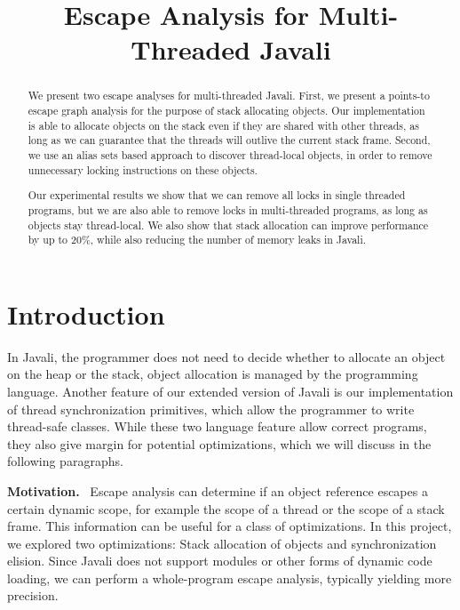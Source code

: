 \documentclass[letterpaper]{article}
\title{Escape Analysis for Multi-Threaded Javali}
\newcommand{\mypar}[1]{{\bf #1.}}
\begin{document}
%
\maketitle
%

\begin{abstract}

We present two escape analyses for multi-threaded Javali. First, we present
a points-to escape graph analysis for the purpose of stack allocating objects.
Our implementation is able to allocate objects on the stack even if they are
shared with other threads, as long as we can guarantee that the threads will
outlive the current stack frame.  Second, we use an alias sets based approach
to discover thread-local objects, in order to remove unnecessary locking
instructions on these objects.

Our experimental results we show that we can remove all locks in single threaded
programs, but we are also able to remove locks in multi-threaded programs, as
long as objects stay thread-local. We also show that stack allocation can
improve performance by up to 20\%, while also reducing the number of memory
leaks in Javali.
\end{abstract}

\section{Introduction}\label{sec:intro}

In Javali, the programmer does not need to decide whether to allocate an object
on the heap or the stack, object allocation is managed by the programming language.
Another feature of our extended version of Javali is our implementation of thread
synchronization primitives, which allow the programmer to write thread-safe
classes. While these two language feature allow correct programs, they also give margin
for potential optimizations, which we will discuss in the following paragraphs.

\mypar{Motivation} \
Escape analysis can determine if an object reference escapes a certain dynamic
scope, for example the scope of a thread or the scope of a stack frame. This
information can be useful for a class of optimizations. In this project, we
explored two optimizations: Stack allocation of objects and synchronization
elision. Since Javali does not support modules or other forms of dynamic code
loading, we can perform a whole-program escape analysis, typically yielding more
precision.
\end{document}
